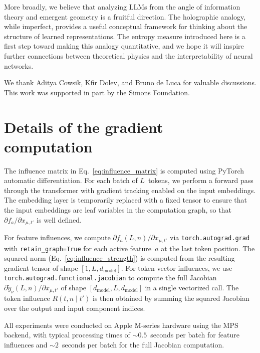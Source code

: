 \documentclass{article}
\begin{document}
More broadly, we believe that analyzing LLMs from the angle of information
theory and emergent geometry is a fruitful direction. The holographic
analogy, while imperfect, provides a useful conceptual framework for
thinking about the structure of learned representations. The entropy
measure introduced here is a first step toward making this analogy
quantitative, and we hope it will inspire further connections between
theoretical physics and the interpretability of neural networks.

\begin{ack}
    We thank Aditya Cowsik, Kfir Dolev, and Bruno de Luca for valuable
    discussions. This work was supported in part by the Simons Foundation.
\end{ack}




\appendix
\section{Details of the gradient computation}
\label{app:gradients}

The influence matrix in Eq.~\eqref{eq:influence_matrix} is computed using
PyTorch automatic differentiation. For each batch of $L$~tokens, we
perform a forward pass through the transformer with gradient tracking
enabled on the input embeddings. The embedding layer is temporarily
replaced with a fixed tensor to ensure that the input embeddings are leaf
variables in the computation graph, so that
$\partial f_a / \partial x_{\mu,t'}$ is well defined.

For feature influences, we compute
$\partial f_a(L,n) / \partial x_{\mu,t'}$ via
\texttt{torch.autograd.grad} with \texttt{retain\_graph=True} for each
active feature~$a$ at the last token position. The squared norm
(Eq.~\eqref{eq:influence_strength}) is computed from the resulting
gradient tensor of shape $[1, L, d_{\mathrm{model}}]$. For token vector
influences, we use \texttt{torch.autograd.functional.jacobian} to compute
the full Jacobian
$\partial \tilde{y}_\nu(L,n) / \partial x_{\mu,t'}$ of shape
$[d_{\mathrm{model}}, L, d_{\mathrm{model}}]$ in a single vectorized
call. The token influence $R(t,n \mid t')$ is then obtained by summing
the squared Jacobian over the output and input component indices.

All experiments were conducted on Apple M-series hardware using the MPS
backend, with typical processing times of ${\sim}0.5$~seconds per batch
for feature influences and ${\sim}2$~seconds per batch for the full
Jacobian computation.
\end{document}
